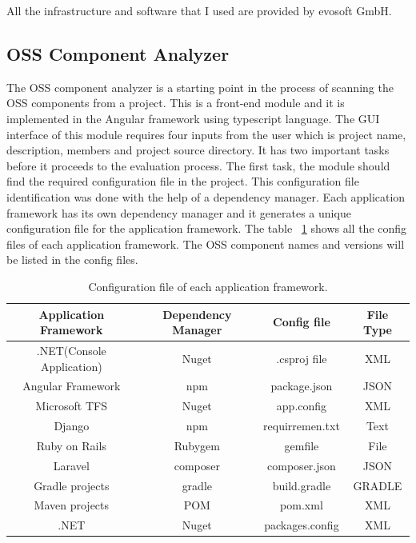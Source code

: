 All the infrastructure and software that I used are provided by evosoft GmbH.
\subsection{OSS Component Analyzer}
The \acs{OSS} component analyzer is a starting point in the process of scanning the \acs{OSS} components from a project. This is a front-end module and it is implemented in the Angular framework using typescript language. The GUI interface of this module requires four inputs from the user which is project name, description, members and project source directory. It has two important tasks before it proceeds to the evaluation process. The first task, the module should find the required configuration file in the project. This configuration file identification was done with the help of a dependency manager. Each application framework has its own dependency manager and it generates a unique configuration file for the application framework. The table ~\ref{tab:configFiles} shows all the config files of each application framework. The \acs{OSS} component names and versions will be listed in the config files. 
\begin{table}[h!]
\begin{center}
 \begin{tabular}{ |c|c|c|c| } 
 	\hline
 	Application Framework & Dependency Manager & Config file & File Type \\
 	\hline
 	.NET(Console Application) & Nuget & .csproj file & XML \\ 
 	Angular Framework & npm & package.json & JSON \\ 
 	Microsoft TFS & Nuget & app.config & XML \\ 
 	Django & npm & requirremen.txt & Text\\ 
 	Ruby on Rails & Rubygem & gemfile & File \\ 
 	Laravel & composer & composer.json & JSON \\ 
 	Gradle projects & gradle & build.gradle & GRADLE \\ 
 	Maven projects & POM & pom.xml & XML \\ 
 	.NET & Nuget & packages.config & XML \\ 
 	\hline
 \end{tabular}
\caption{Configuration file of each application framework.}\label{tab:configFiles}
\end{center} 
\end{table}

